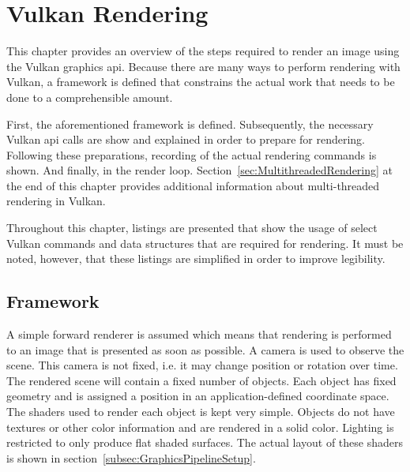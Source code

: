 
\chapter{Vulkan Rendering}
\label{cha:RenderPipeline}


  This chapter provides an overview of the steps required to render an image using the Vulkan graphics \gls{api}.
  Because there are many ways to perform rendering with Vulkan, a framework is defined that constrains the actual work that needs to be done to a comprehensible amount.

  First, the aforementioned framework is defined.
  Subsequently, the necessary Vulkan \gls{api} calls are show and explained in order to prepare for rendering.
  Following these preparations, recording of the actual rendering commands is shown.
  And finally, in the render loop.
  Section~\ref{sec:MultithreadedRendering} at the end of this chapter provides additional information about multi-threaded rendering in Vulkan.

  Throughout this chapter, listings are presented that show the usage of select Vulkan commands and data structures that are required for rendering.
  It must be noted, however, that these listings are simplified in order to improve legibility.

  \section{Framework}
  \label{sec:Framework}
    A simple forward renderer is assumed which means that rendering is performed to an image that is presented as soon as possible.
    A camera is used to observe the scene.
    This camera is not fixed, i.e. it may change position or rotation over time.
    The rendered scene will contain a fixed number of objects.
    Each object has fixed geometry and is assigned a position in an application-defined coordinate space.
    The shaders used to render each object is kept very simple.
    Objects do not have textures or other color information and are rendered in a solid color.
    Lighting is restricted to only produce flat shaded surfaces.
    The actual layout of these shaders is shown in section~\ref{subsec:GraphicsPipelineSetup}.

